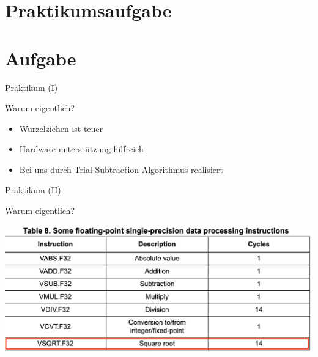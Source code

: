 
  \section{Praktikumsaufgabe}
  
  \section{Aufgabe}
  \begin{frame} {Praktikum (I)}
    \begin{block} {Warum eigentlich?}
      \begin{itemize}
        \item Wurzelziehen ist teuer
        \item Hardware-unterstützung hilfreich
        \item Bei uns durch Trial-Subtraction Algorithmus realisiert
      \end{itemize}
    \end{block}
  \end{frame}

  \begin{frame} {Praktikum (II)}
    \begin{block} {Warum eigentlich?}
      \begin{center}
        \includegraphics[width=.7\textwidth]{figs/arith_cycles.png}
      \end{center}
    \end{block}
  \end{frame}

